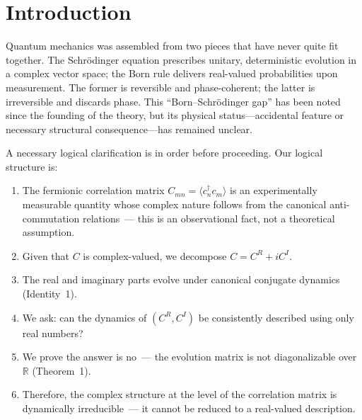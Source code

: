\documentclass[aps,pra,preprint,groupedaddress,amsmath,amssymb,floatfix]{revtex4-2}
\begin{document}
\maketitle

\section{Introduction}
\label{sec:introduction}

Quantum mechanics was assembled from two pieces that have never quite fit together. The Schr\"odinger equation prescribes unitary, deterministic evolution in a complex vector space; the Born rule delivers real-valued probabilities upon measurement. The former is reversible and phase-coherent; the latter is irreversible and discards phase. This ``Born--Schr\"odinger gap'' has been noted since the founding of the theory, but its physical status---accidental feature or necessary structural consequence---has remained unclear.

A necessary logical clarification is in order before proceeding. Our logical structure is:

\begin{enumerate}
\item[(i)] The fermionic correlation matrix $C_{mn} = \langle c^\dagger_n c_m \rangle$ is an experimentally measurable quantity whose complex nature follows from the canonical anti-commutation relations~--- this is an observational fact, not a theoretical assumption.
\item[(ii)] Given that $C$ is complex-valued, we decompose $C = C^R + i C^I$.
\item[(iii)] The real and imaginary parts evolve under canonical conjugate dynamics (Identity~1).
\item[(iv)] We ask: can the dynamics of $(C^R,C^I)$ be consistently described using only real numbers?
\item[(v)] We prove the answer is no~--- the evolution matrix is not diagonalizable over $\mathbb{R}$ (Theorem~1).
\item[(vi)] Therefore, the complex structure at the level of the correlation matrix is dynamically irreducible~--- it cannot be reduced to a real-valued description.
\end{enumerate}
\end{document}
